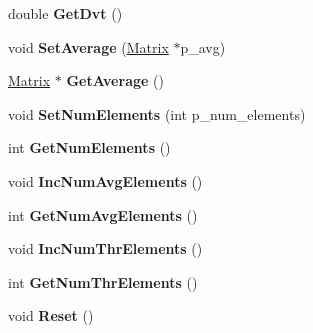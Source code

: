 \begin{DoxyCompactItemize}
\item 
\hypertarget{classns3_1_1EuclideanModel_a364e4c9da2476be209465dbf13d6c6d2}{}double {\bfseries Get\+Dvt} ()\label{classns3_1_1EuclideanModel_a364e4c9da2476be209465dbf13d6c6d2}

\item 
\hypertarget{classns3_1_1EuclideanModel_aa4505c3934a554946bb3317fc65673d2}{}void {\bfseries Set\+Average} (\hyperlink{classns3_1_1Matrix}{Matrix} $\ast$p\+\_\+avg)\label{classns3_1_1EuclideanModel_aa4505c3934a554946bb3317fc65673d2}

\item 
\hypertarget{classns3_1_1EuclideanModel_a61e47444fa4820f8bce92da23725f39b}{}\hyperlink{classns3_1_1Matrix}{Matrix} $\ast$ {\bfseries Get\+Average} ()\label{classns3_1_1EuclideanModel_a61e47444fa4820f8bce92da23725f39b}

\item 
\hypertarget{classns3_1_1EuclideanModel_a9ecde9c5f1921016f6f70d9f71367b0b}{}void {\bfseries Set\+Num\+Elements} (int p\+\_\+num\+\_\+elements)\label{classns3_1_1EuclideanModel_a9ecde9c5f1921016f6f70d9f71367b0b}

\item 
\hypertarget{classns3_1_1EuclideanModel_a9044914dd17b091c849974b0cf3e6d4e}{}int {\bfseries Get\+Num\+Elements} ()\label{classns3_1_1EuclideanModel_a9044914dd17b091c849974b0cf3e6d4e}

\item 
\hypertarget{classns3_1_1EuclideanModel_ae9897ecc8b1bcd922ead38fe2551ae0f}{}void {\bfseries Inc\+Num\+Avg\+Elements} ()\label{classns3_1_1EuclideanModel_ae9897ecc8b1bcd922ead38fe2551ae0f}

\item 
\hypertarget{classns3_1_1EuclideanModel_a0287aff74a0a23c4c68f087e7d109f09}{}int {\bfseries Get\+Num\+Avg\+Elements} ()\label{classns3_1_1EuclideanModel_a0287aff74a0a23c4c68f087e7d109f09}

\item 
\hypertarget{classns3_1_1EuclideanModel_a27a5144e8669c111aacc01fcba346c9e}{}void {\bfseries Inc\+Num\+Thr\+Elements} ()\label{classns3_1_1EuclideanModel_a27a5144e8669c111aacc01fcba346c9e}

\item 
\hypertarget{classns3_1_1EuclideanModel_a9b33de82a5e6ca7b1d3bfdcf72c52bf2}{}int {\bfseries Get\+Num\+Thr\+Elements} ()\label{classns3_1_1EuclideanModel_a9b33de82a5e6ca7b1d3bfdcf72c52bf2}

\item 
\hypertarget{classns3_1_1EuclideanModel_af08b992df40ea5ddc8ade4d20845b3c3}{}void {\bfseries Reset} ()\label{classns3_1_1EuclideanModel_af08b992df40ea5ddc8ade4d20845b3c3}

\end{DoxyCompactItemize}
